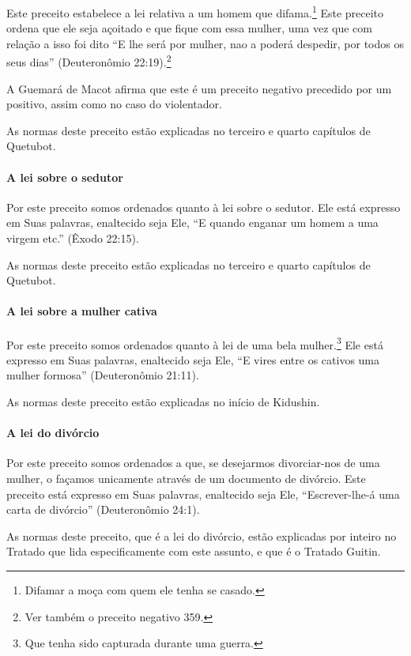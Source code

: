 Este preceito estabelece a lei relativa a um homem que
difama.\footnote{Difamar a moça com quem ele tenha se casado.} Este preceito ordena que ele seja açoitado
e que fique com essa mulher, uma vez que com relação a isso foi dito ``E
lhe será por mulher, nao a poderá despedir, por todos os seus dias''
(Deuteronômio 22:19).\footnote{Ver também o preceito negativo 359.}

A Guemará de Macot afirma que este é um preceito negativo precedido por
um positivo, assim como no caso do violentador.

As normas deste preceito estão explicadas no terceiro e quarto
capítulos de Quetubot.

\paragraph{A lei sobre o sedutor}

Por este preceito somos ordenados quanto à lei sobre o sedutor. Ele está
expresso em Suas palavras, enaltecido seja Ele, ``E quando enganar um
homem a uma virgem etc.'' (Êxodo 22:15).

As normas deste preceito estão explicadas no terceiro e quarto
capítulos de Quetubot.

\paragraph{A lei sobre a mulher cativa}

Por este preceito somos ordenados quanto à lei de uma bela
mulher.\footnote{Que tenha sido capturada durante uma guerra.} Ele está expresso em Suas palavras,
enaltecido seja Ele, ``E vires entre os cativos uma mulher formosa'' (Deuteronômio 21:11).

As normas deste preceito estão explicadas no início de Kidushin.

\paragraph{A lei do divórcio}

Por este preceito somos ordenados a que, se desejarmos divorciar-nos de
uma mulher, o façamos unicamente através de um documento de divórcio.
Este preceito está expresso em Suas palavras, enaltecido seja Ele,
``Escrever-lhe-á uma carta de divórcio'' (Deuteronômio 24:1).

As normas deste preceito, que é a lei do divórcio, estão explicadas por
inteiro no Tratado que lida especificamente com este assunto, e que é o
Tratado Guitin.

